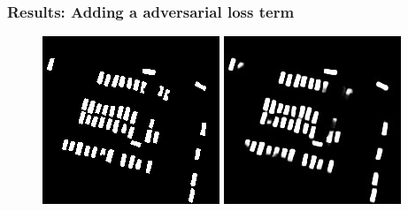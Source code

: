 \documentclass[aspectratio=1610]{beamer}
\begin{document}
\begin{frame}
  \frametitle{\hfill Results: Adding a adversarial loss term}
\begin{figure}[H]
  \includegraphics[width=\linewidth]{gan_vs_class/label_1}
\endminipage\hfill
{}
  \includegraphics[width=\linewidth]{gan_vs_class/class_1}

\end{figure}
\end{frame}
\end{document}
